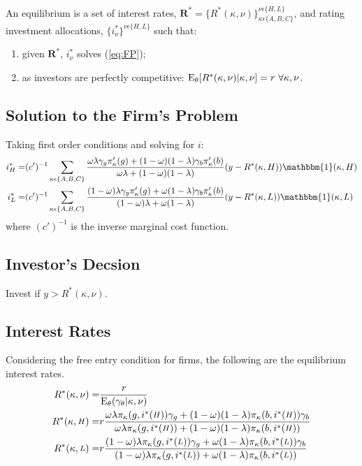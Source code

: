 \documentclass[notitlepage]{article}
\begin{document}
An equilibrium is a set of interest rates, $\mathbf{R}^{*}=\{ R^{*}(\kappa,\nu)\}_{\kappa\epsilon\{A,B,C\}}^{\nu\epsilon\{H,L\}}$, and rating investment allocations, $\{i^{*}_{\nu}\}^{\nu\epsilon\{H,L\}}$ such that:
\begin{enumerate}
	\item given $\mathbf{R}^{*}$, $i^{*}_{\nu}$ solves (\ref{eq:FP});
	\item as investors are perfectly competitive: $\textup{E}_{\theta} [R^{*}(\kappa,\nu)|\kappa,\nu ] = r \,\, \forall \kappa, \nu$.
\end{enumerate}

\subsection{Solution to the Firm's Problem}
Taking first order conditions and solving for $i$:
\begin{align}
i^{*}_{H} = & (c')^{-1}\sum_{\kappa \epsilon \{A,B,C\}} \frac{\omega\lambda\gamma_{g}\pi_{\kappa}'(g)+(1-\omega)(1-\lambda)\gamma_{b}\pi_{\kappa}'(b)}{\omega\lambda+(1-\omega)(1-\lambda)}(y-R^{*}(\kappa,H))\mathbbm{1}(\kappa,H)\\
i^{*}_{L} = & (c')^{-1}\sum_{\kappa \epsilon \{A,B,C\}} \frac{(1-\omega)\lambda\gamma_{g}\pi_{\kappa}'(g)+\omega(1-\lambda)\gamma_{b}\pi_{\kappa}'(b)}{(1-\omega)\lambda+\omega(1-\lambda)}(y-R^{*}(\kappa,L))\mathbbm{1}(\kappa,L)
\end{align}
where $(c')^{-1}$ is the inverse marginal cost function.

\subsection{Investor's Decsion}
Invest if $y>R^{*}(\kappa,\nu)$.

\subsection{Interest Rates}
Considering the free entry condition for firms, the following are the equilibrium interest rates.
\begin{align}
R^{*}(\kappa,\nu) = & \frac{r}{\textup{E}_{\theta}(\gamma_{\theta}|\kappa,\nu)}\nonumber\\
R^{*}(\kappa,\medmath{H}) = & r\frac{\omega\lambda\pi_{\kappa}(g,i^{*}(\medmath{H}))\gamma_{g}+(1-\omega)(1-\lambda)\pi_{\kappa}(b,i^{*}(\medmath{H}))\gamma_{b}}{\omega\lambda\pi_{\kappa}(g,i^{*}(\medmath{H}))+(1-\omega)(1-\lambda)\pi_{\kappa}(b,i^{*}(\medmath{H}))}\\
R^{*}(\kappa,\medmath{L}) = & r\frac{(1-\omega)\lambda\pi_{\kappa}(g,i^{*}(\medmath{L}))\gamma_{g}+\omega(1-\lambda)\pi_{\kappa}(b,i^{*}(\medmath{L}))\gamma_{b}}{(1-\omega)\lambda\pi_{\kappa}(g,i^{*}(\medmath{L}))+\omega(1-\lambda)\pi_{\kappa}(b,i^{*}(\medmath{L}))}
\end{align}
\end{document}
